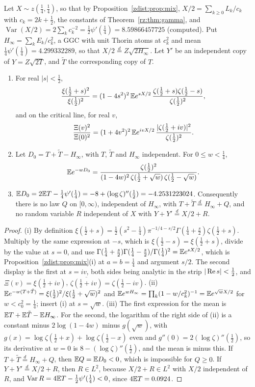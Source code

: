 Let $X\sim z(\frac14,\frac14)$, so that by Proposition~\ref{zdist:prop:mix}, $X/2=\sum_{k\ge0}L_k/c_k$ with $c_k=2k+\frac12$, the constants of Theorem~\ref{rz:thm:gamma}, and $\operatorname{Var}(X/2)=2\sum_kc_k^{-2}=\frac12\psi'(\frac14)=8.59866457725$ (computed). Put $H_\infty=\sum_kE_k/c_k^2$, a GGC with unit Thorin atoms at $c_k^2$ and mean $\frac14\psi'(\frac14)=4.299332289$, so that $X/2\stackrel d=Z\sqrt{2H_\infty}$. Let $Y'$ be an independent copy of $Y=Z\sqrt{2T}$, and $\tilde T$ the corresponding copy of $T$.

\begin{proposition}\label{zdist:prop:arch}
\begin{enumerate}
\item[(i)] For real $|s|<\frac12$,
\[
\frac{\xi(\frac12+s)^2}{\xi(\frac12)^2}=(1-4s^2)^2\,\mathbb{E} e^{sX/2}\,\frac{\zeta(\frac12+s)\zeta(\frac12-s)}{\zeta(\frac12)^2},
\]
and on the critical line, for real $v$,
\[
\frac{\Xi(v)^2}{\Xi(0)^2}=(1+4v^2)^2\,\mathbb{E} e^{ivX/2}\,\frac{|\zeta(\frac12+iv)|^2}{\zeta(\frac12)^2}.
\]
\item[(ii)] Let $D_0=T+\tilde T-H_\infty$, with $T$, $\tilde T$ and $H_\infty$ independent. For $0\le w<\frac14$,
\[
\mathbb{E} e^{-wD_0}=\frac{\zeta(\frac12)^2}{(1-4w)^2\,\zeta(\frac12+\sqrt w)\,\zeta(\frac12-\sqrt w)} .
\]
\item[(iii)] $\mathbb{E} D_0=2\mathbb{E} T-\frac14\psi'(\frac14)=-8+(\log\zeta)''(\frac12)=-4.2531223024$. Consequently there is no law $Q$ on $[0,\infty)$, independent of $H_\infty$, with $T+\tilde T\stackrel d=H_\infty+Q$, and no random variable $R$ independent of $X$ with $Y+Y'\stackrel d=X/2+R$.
\end{enumerate}
\end{proposition}

\begin{proof}
(i) By definition $\xi(\frac12+s)=\frac12(s^2-\frac14)\pi^{-1/4-s/2}\Gamma(\frac14+\frac s2)\zeta(\frac12+s)$. Multiply by the same expression at $-s$, which is $\xi(\frac12-s)=\xi(\frac12+s)$, divide by the value at $s=0$, and use $\Gamma(\frac14+\frac s2)\Gamma(\frac14-\frac s2)/\Gamma(\frac14)^2=\mathbb{E} e^{sX/2}$, which is Proposition~\ref{zdist:prop:mix}(i) at $a=b=\frac14$ and argument $s/2$. The second display is the first at $s=iv$, both sides being analytic in the strip $|\operatorname{Re} s|<\frac12$, and $\Xi(v)=\xi(\frac12+iv)$, $\overline{\zeta(\frac12+iv)}=\zeta(\frac12-iv)$. (ii) $\mathbb{E} e^{-w(T+\tilde T)}=\xi(\frac12)^2/\xi(\frac12+\sqrt w)^2$ and $\mathbb{E} e^{wH_\infty}=\prod_k(1-w/c_k^2)^{-1}=\mathbb{E} e^{\sqrt wX/2}$ for $w<c_0^2=\frac14$; insert (i) at $s=\sqrt w$. (iii) The first expression for the mean is $\mathbb{E} T+\mathbb{E}\tilde T-\mathbb{E} H_\infty$. For the second, the logarithm of the right side of (ii) is a constant minus $2\log(1-4w)$ minus $g(\sqrt w)$, with $g(x)=\log\zeta(\frac12+x)+\log\zeta(\frac12-x)$ even and $g''(0)=2(\log\zeta)''(\frac12)$, so its derivative at $w=0$ is $8-(\log\zeta)''(\frac12)$, and the mean is minus this. If $T+\tilde T\stackrel d=H_\infty+Q$, then $\mathbb{E} Q=\mathbb{E} D_0<0$, which is impossible for $Q\ge0$. If $Y+Y'\stackrel d=X/2+R$, then $R\in L^2$, because $X/2+R\in L^2$ with $X/2$ independent of $R$, and $\operatorname{Var}R=4\mathbb{E} T-\frac12\psi'(\frac14)<0$, since $4\mathbb{E} T=0.0924$.
\end{proof}

